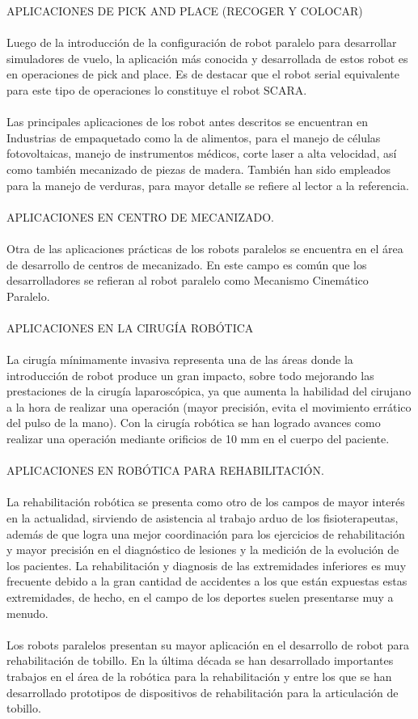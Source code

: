 \documentclass[12pt,a4paper]{article}
\begin{document}
APLICACIONES DE PICK AND PLACE (RECOGER Y COLOCAR)\\
\\
 Luego de la introducción de la configuración de robot paralelo para desarrollar simuladores de vuelo, la aplicación más conocida y desarrollada de estos robot es en operaciones de pick and place. Es de destacar que el robot serial equivalente para este tipo de operaciones lo constituye el robot SCARA.\\
 \\
Las principales aplicaciones de los robot antes descritos se encuentran en Industrias de empaquetado como la de alimentos, para el manejo de células fotovoltaicas, manejo de instrumentos médicos, corte laser a alta velocidad, así como también mecanizado de piezas de madera. También han sido empleados para la manejo de verduras, para mayor detalle se refiere al lector a la referencia.\\
\\
APLICACIONES EN CENTRO DE MECANIZADO. \\
\\
Otra de las aplicaciones prácticas de los robots paralelos se encuentra en el área de desarrollo de centros de mecanizado. En este campo es común que los desarrolladores se refieran al robot paralelo como Mecanismo Cinemático Paralelo.\\
\\
APLICACIONES EN LA CIRUGÍA ROBÓTICA\\
\\
 La cirugía mínimamente invasiva representa una de las áreas donde la introducción de robot produce un gran impacto, sobre todo mejorando las prestaciones de la cirugía laparoscópica, ya que aumenta la habilidad del cirujano a la hora de realizar una operación (mayor precisión, evita el movimiento errático del pulso de la mano). Con la cirugía robótica se han logrado avances como realizar una operación mediante orificios de 10 mm en el cuerpo del paciente. \\
 \\
 APLICACIONES EN ROBÓTICA PARA REHABILITACIÓN.\\
 \\
 La rehabilitación robótica se presenta como otro de los campos de mayor interés en la actualidad, sirviendo de asistencia al trabajo arduo de los fisioterapeutas, además de que logra una mejor coordinación para los ejercicios de rehabilitación y mayor precisión en el diagnóstico de lesiones y la medición de la evolución de los pacientes. La rehabilitación y diagnosis de las extremidades inferiores es muy frecuente debido a la gran cantidad de accidentes a los que están expuestas estas extremidades, de hecho, en el campo de los deportes suelen presentarse muy a menudo.\\
 \\
 Los robots paralelos presentan su mayor aplicación en el desarrollo de robot para rehabilitación de tobillo. En la última década se han desarrollado importantes trabajos en el área de la robótica para la rehabilitación y entre los que se han desarrollado prototipos de dispositivos de rehabilitación para la articulación de tobillo.
\end{document}
